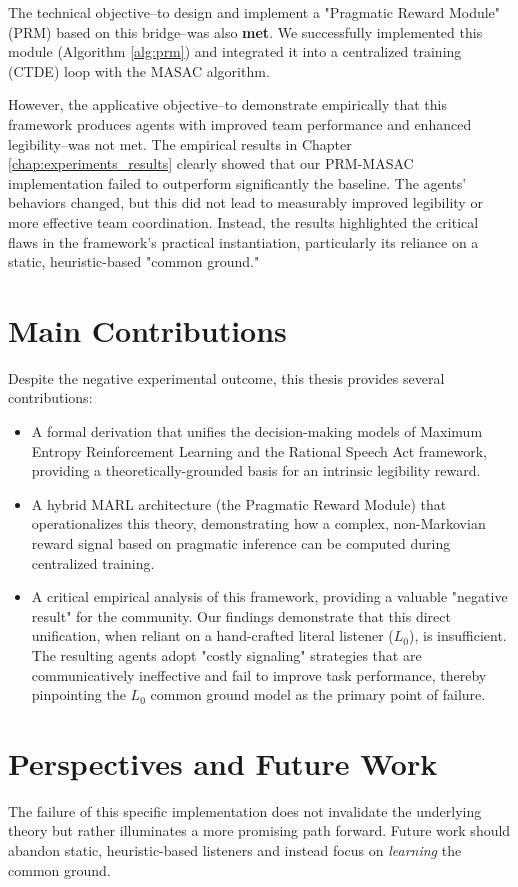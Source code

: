 \documentclass[12pt, a4paper]{report}
\begin{document}
The technical objective--to design and implement a "Pragmatic Reward Module" (PRM) based on this bridge--was also \textbf{met}. We successfully implemented this module (Algorithm \ref{alg:prm}) and integrated it into a centralized training (CTDE) loop with the MASAC algorithm.

However, the applicative objective--to demonstrate empirically that this framework produces agents with improved team performance and enhanced legibility--was not met. The empirical results in Chapter \ref{chap:experiments_results} clearly showed that our PRM-MASAC implementation failed to outperform significantly the baseline. The agents' behaviors changed, but this did not lead to measurably improved legibility or more effective team coordination. Instead, the results highlighted the critical flaws in the framework's practical instantiation, particularly its reliance on a static, heuristic-based "common ground."

\section{Main Contributions}
Despite the negative experimental outcome, this thesis provides several contributions:

\begin{itemize}
    \item A  formal derivation that unifies the decision-making models of Maximum Entropy Reinforcement Learning and the Rational Speech Act framework, providing a theoretically-grounded basis for an intrinsic legibility reward.

    \item A hybrid MARL architecture (the Pragmatic Reward Module) that operationalizes this theory, demonstrating how a complex, non-Markovian reward signal based on pragmatic inference can be computed during centralized training.

    \item A critical empirical analysis of this framework, providing a valuable "negative result" for the community. Our findings demonstrate that this direct unification, when reliant on a hand-crafted literal listener ($L_0$), is insufficient. The resulting agents adopt "costly signaling" strategies that are communicatively ineffective and fail to improve task performance, thereby pinpointing the $L_0$ common ground model as the primary point of failure.
\end{itemize}

\section{Perspectives and Future Work}
The failure of this specific implementation does not invalidate the underlying theory but rather illuminates a more promising path forward. Future work should abandon static, heuristic-based listeners and instead focus on \textit{learning} the common ground.
\end{document}
